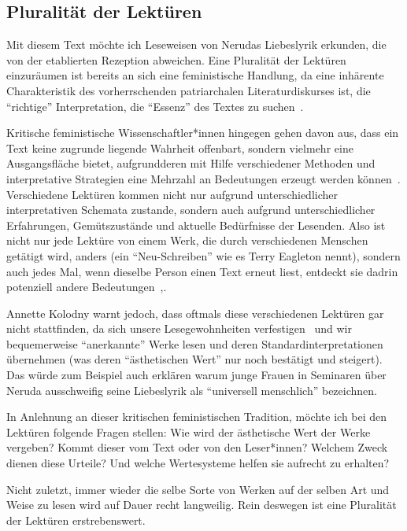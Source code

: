 \subsection{Pluralität der Lektüren}

Mit diesem Text möchte ich Leseweisen von Nerudas Liebeslyrik erkunden, die von der etablierten Rezeption abweichen.
Eine Pluralität der Lektüren einzuräumen ist bereits an sich eine feministische Handlung,
da eine inhärente Charakteristik des vorherrschenden patriarchalen Literaturdiskurses ist, die ``richtige'' Interpretation, die ``Essenz'' des Textes zu suchen~\cite{Kolodny1980}.

Kritische feministische Wissenschaftler*innen hingegen gehen davon aus, dass ein Text keine zugrunde liegende Wahrheit offenbart, sondern vielmehr eine Ausgangsfläche bietet, aufgrundderen mit Hilfe verschiedener Methoden und interpretative Strategien eine Mehrzahl an Bedeutungen erzeugt werden können~\cite{Beehler1988}.
Verschiedene Lektüren kommen nicht nur aufgrund unterschiedlicher interpretativen Schemata zustande, sondern auch aufgrund unterschiedlicher Erfahrungen, Gemütszustände und aktuelle Bedürfnisse der Lesenden.
Also ist nicht nur jede Lektüre von einem Werk, die durch verschiedenen Menschen getätigt wird, anders (ein ``Neu-Schreiben'' wie es Terry Eagleton nennt), sondern auch jedes Mal, wenn dieselbe Person einen Text erneut liest, entdeckt sie dadrin potenziell andere Bedeutungen~\cite{Eagleton1997},\cite{Kolodny1980}.

Annette Kolodny warnt jedoch, dass oftmals diese verschiedenen Lektüren gar nicht stattfinden, da sich unsere Lesegewohnheiten verfestigen~\cite{Kolodny1980} und wir bequemerweise ``anerkannte'' Werke lesen und deren Standardinterpretationen übernehmen (was deren ``ästhetischen Wert'' nur noch bestätigt und steigert).
Das würde zum Beispiel auch erklären warum junge Frauen in Seminaren über Neruda ausschweifig seine Liebeslyrik als ``universell menschlich'' bezeichnen.

In Anlehnung an dieser kritischen feministischen Tradition, möchte ich bei den Lektüren folgende Fragen stellen: Wie wird der ästhetische Wert der Werke vergeben? Kommt dieser vom Text oder von den Leser*innen? 
Welchem Zweck dienen diese Urteile?
Und welche Wertesysteme helfen sie aufrecht zu erhalten?

Nicht zuletzt, immer wieder die selbe Sorte von Werken auf der selben Art und Weise zu lesen wird auf Dauer recht langweilig. %
Rein deswegen ist eine Pluralität der Lektüren erstrebenswert.
